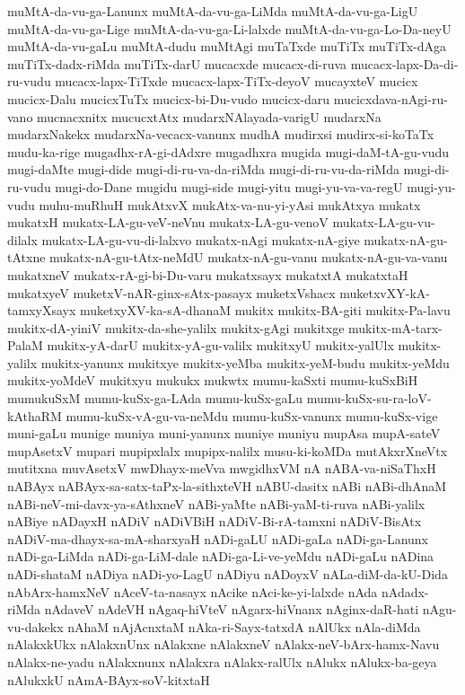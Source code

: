 {muMtA-da-vu-ga-Lanunx
muMtA-da-vu-ga-LiMda
muMtA-da-vu-ga-LigU
muMtA-da-vu-ga-Lige
muMtA-da-vu-ga-Li-lalxde
muMtA-da-vu-ga-Lo-Da-neyU
muMtA-da-vu-gaLu
muMtA-dudu
muMtAgi
muTaTxde
muTiTx
muTiTx-dAga
muTiTx-dadx-riMda
muTiTx-darU
mucacxde
mucacx-di-ruva
mucacx-lapx-Da-di-ru-vudu
mucacx-lapx-TiTxde
mucacx-lapx-TiTx-deyoV
mucayxteV
mucicx
mucicx-Dalu
mucicxTuTx
mucicx-bi-Du-vudo
mucicx-daru
mucicxdava-nAgi-ru-vano
mucnacxnitx
mucucxtAtx
mudarxNAlayada-varigU
mudarxNa
mudarxNakekx
mudarxNa-vecacx-vanunx
mudhA
mudirxsi
mudirx-si-koTaTx
mudu-ka-rige
mugadhx-rA-gi-dAdxre
mugadhxra
mugida
mugi-daM-tA-gu-vudu
mugi-daMte
mugi-dide
mugi-di-ru-va-da-riMda
mugi-di-ru-vu-da-riMda
mugi-di-ru-vudu
mugi-do-Dane
mugidu
mugi-side
mugi-yitu
mugi-yu-va-va-regU
mugi-yu-vudu
muhu-muRhuH
mukAtxvX
mukAtx-va-nu-yi-yAsi
mukAtxya
mukatx
mukatxH
mukatx-LA-gu-veV-neVnu
mukatx-LA-gu-venoV
mukatx-LA-gu-vu-dilalx
mukatx-LA-gu-vu-di-lalxvo
mukatx-nAgi
mukatx-nA-giye
mukatx-nA-gu-tAtxne
mukatx-nA-gu-tAtx-neMdU
mukatx-nA-gu-vanu
mukatx-nA-gu-va-vanu
mukatxneV
mukatx-rA-gi-bi-Du-varu
mukatxsayx
mukatxtA
mukatxtaH
mukatxyeV
muketxV-nAR-ginx-sAtx-pasayx
muketxVshacx
muketxvXY-kA-tamxyXsayx
muketxyXV-ka-sA-dhanaM
mukitx
mukitx-BA-giti
mukitx-Pa-lavu
mukitx-dA-yiniV
mukitx-da-she-yalilx
mukitx-gAgi
mukitxge
mukitx-mA-tarx-PalaM
mukitx-yA-darU
mukitx-yA-gu-valilx
mukitxyU
mukitx-yalUlx
mukitx-yalilx
mukitx-yanunx
mukitxye
mukitx-yeMba
mukitx-yeM-budu
mukitx-yeMdu
mukitx-yoMdeV
mukitxyu
mukukx
mukwtx
mumu-kaSxti
mumu-kuSxBiH
mumukuSxM
mumu-kuSx-ga-LAda
mumu-kuSx-gaLu
mumu-kuSx-su-ra-loV-kAthaRM
mumu-kuSx-vA-gu-va-neMdu
mumu-kuSx-vanunx
mumu-kuSx-vige
muni-gaLu
munige
muniya
muni-yanunx
muniye
muniyu
mupAsa
mupA-sateV
mupAsetxV
mupari
mupipxlalx
mupipx-nalilx
musu-ki-koMDa
mutAkxrXneVtx
mutitxna
muvAsetxV
mwDhayx-meVva
mwgidhxVM
nA
nABA-va-niSaThxH
nABAyx
nABAyx-sa-satx-taPx-la-sithxteVH
nABU-dasitx
nABi
nABi-dhAnaM
nABi-neV-mi-davx-ya-sAthxneV
nABi-yaMte
nABi-yaM-ti-ruva
nABi-yalilx
nABiye
nADayxH
nADiV
nADiVBiH
nADiV-Bi-rA-tamxni
nADiV-BisAtx
nADiV-ma-dhayx-sa-mA-sharxyaH
nADi-gaLU
nADi-gaLa
nADi-ga-Lanunx
nADi-ga-LiMda
nADi-ga-LiM-dale
nADi-ga-Li-ve-yeMdu
nADi-gaLu
nADina
nADi-shataM
nADiya
nADi-yo-LagU
nADiyu
nADoyxV
nALa-diM-da-kU-Dida
nAbArx-hamxNeV
nAceV-ta-nasayx
nAcike
nAci-ke-yi-lalxde
nAda
nAdadx-riMda
nAdaveV
nAdeVH
nAgaq-hiVteV
nAgarx-hiVnanx
nAginx-daR-hati
nAgu-vu-dakekx
nAhaM
nAjAcnxtaM
nAka-ri-Sayx-tatxdA
nAlUkx
nAla-diMda
nAlakxkUkx
nAlakxnUnx
nAlakxne
nAlakxneV
nAlakx-neV-bArx-hamx-Navu
nAlakx-ne-yadu
nAlakxnunx
nAlakxra
nAlakx-ralUlx
nAlukx
nAlukx-ba-geya
nAlukxkU
nAmA-BAyx-soV-kitxtaH
}
